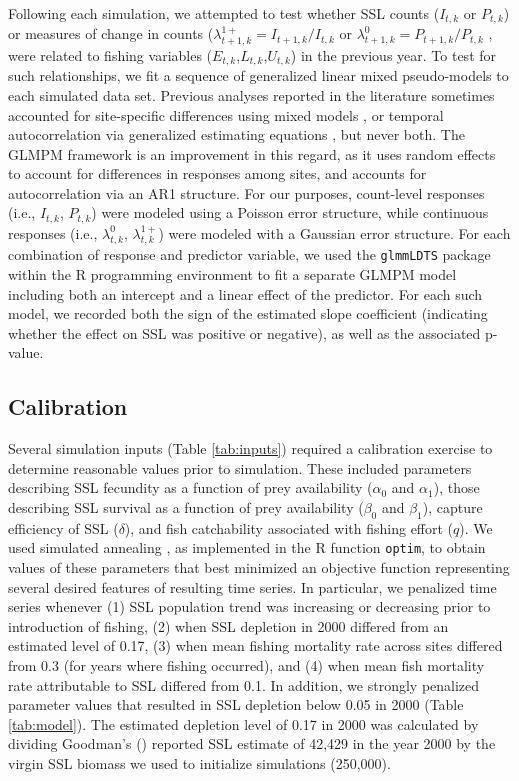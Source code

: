 \documentclass[nonumbib,leqno]{nrc1}
\begin{document}
Following each simulation, we attempted to test whether SSL counts ($I_{t,k}$ or $P_{t,k}$) or measures of change in counts ($\lambda_{t+1,k}^{1+}=I_{t+1,k}/I_{t,k}$ or $\lambda_{t+1,k}^{0}=P_{t+1,k}/P_{t,k}$ , were related to fishing variables ($E_{t,k}$,$L_{t,k}$,$U_{t,k}$) in the previous year.  To test for such relationships, we fit a sequence of generalized linear mixed pseudo-models \citep[GLMPM;][]{VerHoef2010} to each simulated data set.  Previous analyses reported in the literature sometimes accounted for site-specific differences using mixed models \citep{Hui2011}, or temporal autocorrelation via generalized estimating equations \citep{Dillingham:2006fv,Trites:2010ly}, but never both.  The GLMPM framework is an improvement in this regard, as it uses random effects to account for differences in responses among sites, and accounts for autocorrelation via an AR1 structure.  For our purposes, count-level responses (i.e., $I_{t,k}$, $P_{t,k}$) were modeled using a Poisson error structure, while continuous responses (i.e., $\lambda_{t,k}^{0}$, $\lambda_{t,k}^{1+}$) were modeled with a Gaussian error structure.  For each combination of response and predictor variable, we used the \texttt{glmmLDTS} package \citep{VerHoef2010} within the R programming environment \citep{RDevelopmentCoreTeam2012} to fit a separate GLMPM model including both an intercept and a linear effect of the predictor. For each such model, we recorded both the sign of the estimated slope coefficient (indicating whether the effect on SSL was positive or negative), as well as the associated p-value.

\subsection{Calibration}
\label{section:Calibration}

Several simulation inputs (Table \ref{tab:inputs}) required a calibration exercise to determine reasonable values prior to simulation.  These included parameters describing SSL fecundity as a function of prey availability ($\alpha_0$ and $\alpha_1$), those describing SSL survival as a function of prey availability ($\beta_0$ and $\beta_1$), capture efficiency of SSL ($\delta$), and fish catchability associated with fishing effort ($q$).  We used simulated annealing \citep{Belisle1992}, as implemented in the R function \texttt{optim}, to obtain values of these parameters that best minimized an objective function representing several desired features of resulting time series.  In particular, we penalized time series whenever (1) SSL population trend was increasing or decreasing prior to introduction of fishing, (2) when SSL depletion in 2000 differed from an estimated level of 0.17, (3) when mean fishing mortality rate across sites differed from 0.3 (for years where fishing occurred), and (4) when mean fish mortality rate attributable to SSL differed from 0.1.  In addition, we strongly penalized parameter values that resulted in SSL depletion below 0.05 in 2000 (Table \ref{tab:model}). The estimated depletion level of 0.17 in 2000 was calculated by dividing Goodman's (\citeyear{Goodman2008}) reported SSL estimate of 42,429 in the year 2000 by the virgin SSL biomass we used to initialize simulations (250,000).
\end{document}
